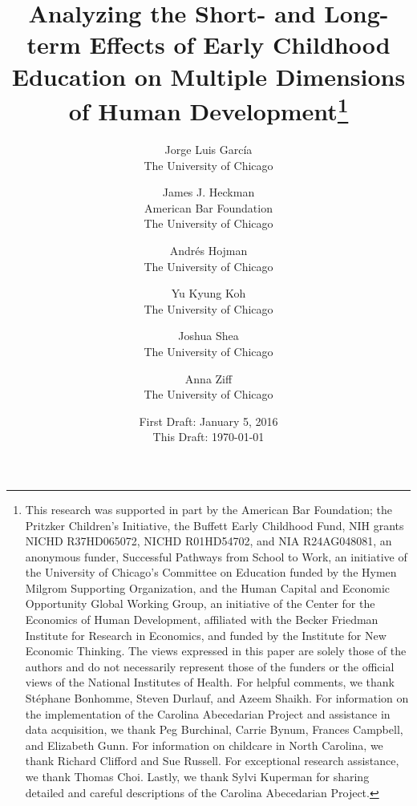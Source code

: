 




\title{\Large \textbf{Analyzing the Short- and Long-term Effects of Early Childhood Education on Multiple Dimensions of Human Development}\thanks{This research was supported in part by the American Bar Foundation; the Pritzker Children's Initiative, the
Buffett Early Childhood Fund, NIH grants NICHD R37HD065072, NICHD R01HD54702, and NIA R24AG048081, an
anonymous funder, Successful Pathways from School to Work, an initiative of the University of Chicago's Committee
on Education funded by the Hymen Milgrom Supporting Organization, and the Human Capital and Economic
Opportunity Global Working Group, an initiative of the Center for the Economics of Human Development, affiliated with
the Becker Friedman Institute for Research in Economics, and funded by the Institute for New Economic Thinking. The
views expressed in this paper are solely those of the authors and do not necessarily represent those of the funders or
the official views of the National Institutes of Health. For helpful comments, we thank St\'{e}phane Bonhomme, Steven Durlauf, and Azeem Shaikh. For information on the implementation of the Carolina Abecedarian Project and assistance in data acquisition, we thank Peg Burchinal, Carrie Bynum, Frances Campbell, and Elizabeth Gunn. For information on childcare in North Carolina, we thank Richard Clifford and Sue Russell. For exceptional research assistance, we thank Thomas Choi. Lastly, we thank Sylvi Kuperman for sharing detailed and careful descriptions of the Carolina Abecedarian Project.}}

\author{
Jorge Luis Garc\'{i}a\\
The University of Chicago \and
James J. Heckman \\
American Bar Foundation \\
The University of Chicago \and
Andr\'{e}s Hojman\\
The University of Chicago \and
Yu Kyung Koh \\ 
The University of Chicago \and
Joshua Shea \\
The University of Chicago \and
Anna Ziff \\ 
The University of Chicago}
\date{First Draft: January 5, 2016\\ This Draft: \today}
\maketitle

